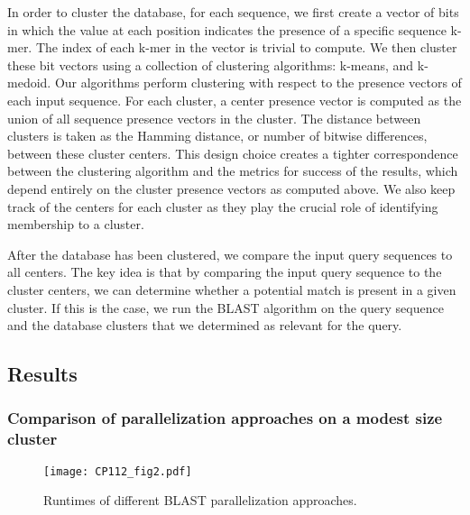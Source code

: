 In order to cluster the database, for each sequence, we first create a vector of bits in which the value at each position indicates the presence of a specific sequence k-mer. The index of each k-mer in the vector is trivial to compute.
We then cluster these bit vectors using a collection of clustering algorithms: k-means\cite{hartigan1979algorithm}, and k-medoid\cite{van2003new}.
Our algorithms perform clustering with respect to the presence vectors of each input sequence. For each cluster, a center presence vector is computed as the union of all sequence presence vectors in the cluster. The distance between clusters is taken as the Hamming distance, or number of bitwise differences, between these cluster centers. This design choice creates a tighter correspondence between the clustering algorithm and the metrics for success of the results, which depend entirely on the cluster presence vectors as computed above.
We also keep track of the centers for each cluster as they play the crucial role of identifying membership to a cluster.

After the database has been clustered, we compare the input query sequences to all centers. The key idea is that by comparing the input query sequence to the cluster centers, we can determine whether a potential match is present in a given cluster. If this is the case, we run the BLAST algorithm on the query sequence and the database clusters that we determined as relevant for the query.


%
\subsection{Results}

\subsubsection{Comparison of parallelization approaches on a modest size cluster}

\begin{figure}[!htb]%
\begin{center}
\texttt{[image: CP112\_fig2.pdf]}
\end{center}
\renewcommand{\baselinestretch}{1}
\small\normalsize
\begin{quote}
\caption[Runtimes of different BLAST parallelization approaches]{Runtimes of different BLAST parallelization approaches.}
\label{fig:parallel_approaches}
\end{quote}
\end{figure}
\renewcommand{\baselinestretch}{2}
\small\normalsize


